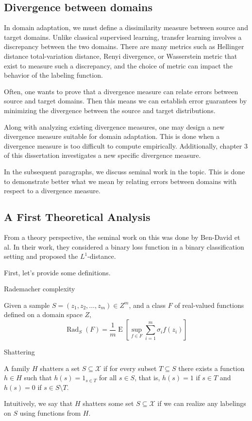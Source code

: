 \subsection{Divergence between domains}

In domain adaptation, we must define a dissimilarity measure between source and target domains. Unlike classical supervised learning, transfer learning involves a discrepancy between the two domains. There are many metrics such as Hellinger distance total-variation distance, Renyi divergence, or Wasserstein metric that exist to measure such a discrepancy, and the choice of metric can impact the behavior of the labeling function. 

Often, one wants to prove that a divergence measure can relate errors between source and target domains. Then this means we can establish error guarantees by minimizing the divergence between the source and target distributions.

Along with analyzing existing divergence measures, one may design a new divergence measure suitable for domain adaptation. This is done when a divergence measure is too difficult to compute empirically.  Additionally, chapter 3 of this dissertation investigates a new specific divergence measure.

In the subsequent paragraphs, we discuss seminal work in the topic. This is done to demonstrate better what we mean by relating errors between domains with respect to a divergence measure.

\subsection*{A First Theoretical Analysis}
From a theory perspective, the seminal work on this was done by Ben-David et al. In their work, they considered a binary loss function in a binary classification setting and proposed the $L^1$-distance.

First, let's provide some definitions.

\begin{definition}{Rademacher complexity}
	
	Given a sample $S=(z_1, z_2, \dots, z_m) \in Z^m$, and a class $F$ of real-valued functions defined on a domain space $Z$,
	\[
	\operatorname{Rad}_S(F) 
	= 
	\frac{1}{m}
	\operatorname{E} \left[
	\sup_{f \in F}
	\sum_{i=1}^m \sigma_i f(z_i) 
	\right]
	\]
\end{definition}

\begin{definition}{Shattering}
	
	A family $H$ shatters a set $S \subseteq \mathcal{X}$ if for every subset $T \subseteq S$ there exists a function $h \in H$ such that $h(s) = 1_{s \in T}$ for all $s \in S$, that is, $h(s) = 1$ if $s \in T$ and $h(s) = 0$ if $s \in S \setminus T$.
	
	Intuitively, we say that $H$ shatters some set $S \subseteq \mathcal{X}$ if we can realize any labelings on $S$ using functions from $H$.
	
\end{definition}

